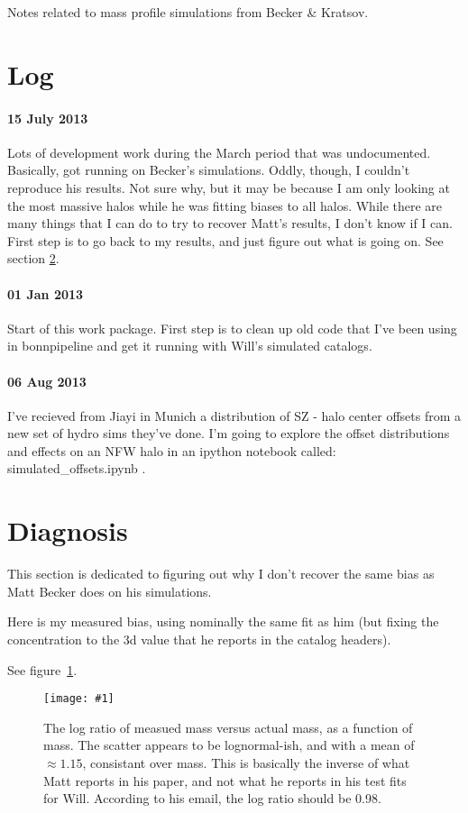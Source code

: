 \documentclass[11pt]{article}
\newcommand{\logfig}[2]{
See figure~\ref{fig:#1}.
\begin{figure}[!ht] 
\texttt{[image: \#1]} 
\caption{#2} 
\label{fig:#1} 
\end{figure}
}
\begin{document}
Notes related to mass profile simulations from Becker \& Kratsov.

\tableofcontents


\section{Log}

\paragraph{15 July 2013}
Lots of development work during the March period that was undocumented. 
Basically, got running on Becker's simulations. 
Oddly, though, I couldn't reproduce his results. 
Not sure why, but it may be because I am only looking at the most massive halos while he was fitting biases to all halos.
While there are many things that I can do to try to recover Matt's results, I don't know if I can.
First step is to go back to my results, and just figure out what is going on.
See section \ref{sec:diagnosis}.

\paragraph{01 Jan 2013}
Start of this work package. 
First step is to clean up old code that I've been using in bonnpipeline and get it running with Will's simulated catalogs.

\paragraph{06 Aug 2013}
I've recieved from Jiayi in Munich a distribution of SZ - halo center offsets from a new set of hydro sims they've done. I'm going to explore the offset distributions and effects on an NFW halo in an ipython notebook called: simulated\_offsets.ipynb .







\section{Diagnosis}
\label{sec:diagnosis}

This section is dedicated to figuring out why I don't recover the same bias as Matt Becker does on his simulations.

Here is my measured bias, using nominally the same fit as him (but fixing the concentration to the 3d value that he reports in the catalog headers).

\logfig{recovered_bias}{The log ratio of measued mass versus actual mass, as a function of mass. The scatter appears to be lognormal-ish, and with a mean of $\approx1.15$, consistant over mass. This is basically the inverse of what Matt reports in his paper, and not what he reports in his test fits for Will. According to his email, the log ratio should be 0.98.}
\end{document}
